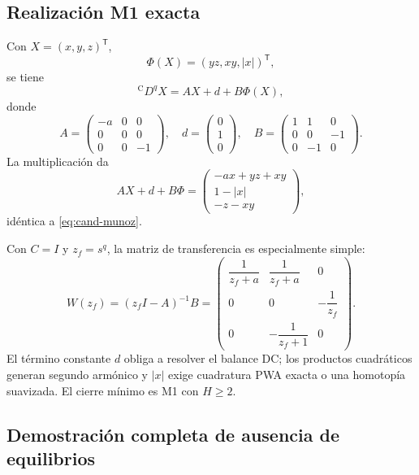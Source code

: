 \subsection{Realización M1 exacta}

Con \(X=(x,y,z)^{\mathsf T}\),
\[
 \Phi(X)=(yz,xy,|x|)^{\mathsf T},
\]
se tiene
\begin{equation}
 {}^{\mathrm C}D^qX=A X+d+B\Phi(X),
 \label{eq:cand-munoz-mimo}
\end{equation}
donde
\begin{equation}
 A=\begin{pmatrix}
 -a&0&0\\0&0&0\\0&0&-1
 \end{pmatrix},\quad
 d=\begin{pmatrix}0\\1\\0\end{pmatrix},\quad
 B=\begin{pmatrix}
 1&1&0\\
 0&0&-1\\
 0&-1&0
 \end{pmatrix}.
 \label{eq:cand-munoz-matrices}
\end{equation}
La multiplicación da
\[
 AX+d+B\Phi=
 \begin{pmatrix}
 -ax+yz+xy\\1-|x|\\-z-xy
 \end{pmatrix},
\]
idéntica a \cref{eq:cand-munoz}.

Con \(C=I\) y \(z_f=s^q\), la matriz de transferencia es especialmente simple:
\begin{equation}
 W(z_f)=(z_fI-A)^{-1}B
 =\begin{pmatrix}
 \dfrac1{z_f+a}&\dfrac1{z_f+a}&0\\[0.8em]
 0&0&-\dfrac1{z_f}\\[0.8em]
 0&-\dfrac1{z_f+1}&0
 \end{pmatrix}.
 \label{eq:cand-munoz-transfer}
\end{equation}
El término constante \(d\) obliga a resolver el balance DC; los productos
cuadráticos generan segundo armónico y \(|x|\) exige cuadratura PWA exacta o
una homotopía suavizada. El cierre mínimo es M1 con \(H\ge2\).

\subsection{Demostración completa de ausencia de equilibrios}

